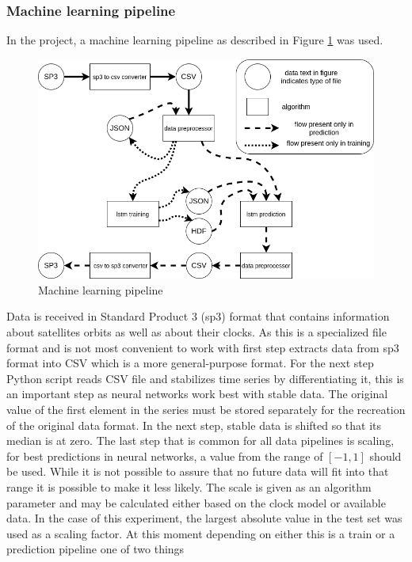 \subsubsection{Machine learning pipeline}
In the project, a machine learning pipeline as described in Figure \ref{fig:pipeline} was used.
\begin{figure}[ht] 
	\centering
	\includegraphics[width=\textwidth]{res/pipeline}
	\caption{Machine learning pipeline}
	\label{fig:pipeline}
\end{figure}
Data is received in Standard Product 3 (sp3) format that contains information about satellites
orbits as well as about their clocks.
As this is a specialized file format and is not most convenient to work with first step extracts
data from sp3 format into CSV which is a more general-purpose format.
For the next step Python script reads CSV file and stabilizes time series by differentiating it,
this is an important step as neural networks work best with stable data.
The original value of the first element in the series must be stored separately for the recreation
of the original data format. In the next step, stable data is shifted so that its median 
is at zero.
The last step that is common for all data pipelines is scaling, for best predictions in neural
networks, a value from the range of $[-1 , 1]$ should be used. While it is not possible 
to assure that no future data will fit into that range it is possible to make it less likely.
The scale is given as an algorithm parameter and may be calculated either based on the clock model
or available data. In the case of this experiment, the largest absolute value in the test set was
used as a scaling factor.
At this moment depending on either this is a train or a prediction pipeline one of two things

